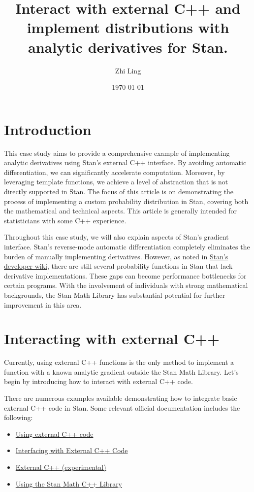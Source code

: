 \documentclass[11pt]{article}
\title{Interact with external C++ and implement distributions with analytic derivatives for Stan.}
\author{Zhi Ling}
\date{\today}
\begin{document}
\maketitle


\section{Introduction}


This case study aims to provide a comprehensive example of implementing analytic derivatives using Stan's external C++ interface. By avoiding automatic differentiation, we can significantly accelerate computation. Moreover, by leveraging template functions, we achieve a level of abstraction that is not directly supported in Stan. The focus of this article is on demonstrating the process of implementing a custom probability distribution in Stan, covering both the mathematical and technical aspects. This article is generally intended for statisticians with some C++ experience. 

Throughout this case study, we will also explain aspects of Stan's gradient interface. Stan's reverse-mode automatic differentiation completely eliminates the burden of manually implementing derivatives. However, as noted in \href{https://github.com/stan-dev/stan/wiki/Contributing-to-Stan-Without-C-Plus-Plus--Experience}{Stan's developer wiki}, there are still several probability functions in Stan that lack derivative implementations. These gaps can become performance bottlenecks for certain programs. With the involvement of individuals with strong mathematical backgrounds, the Stan Math Library has substantial potential for further improvement in this area.




\section{Interacting with external C++}

Currently, using external C++ functions is the only method to implement a function with a known analytic gradient outside the Stan Math Library. Let's begin by introducing how to interact with external C++ code.

There are numerous examples available demonstrating how to integrate basic external C++ code in Stan. Some relevant official documentation includes the following:

\begin{itemize}
    \item \href{https://mc-stan.org/docs/cmdstan-guide/using-external-cpp-code.html}{Using external C++ code}
    \item \href{https://mc-stan.org/rstan/articles/external.html}{Interfacing with External C++ Code}
    \item \href{https://pystan2.readthedocs.io/en/latest/external_cpp.html}{External C++ (experimental)}
    \item \href{https://cran.r-project.org/web/packages/StanHeaders/vignettes/stanmath.html}{Using the Stan Math C++ Library}
\end{itemize}
\end{document}
